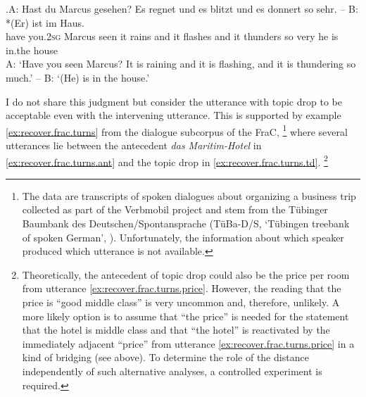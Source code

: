 \exg.\label{ex:recover.volodina.onea.rain}A: Hast du Marcus gesehen? Es regnet und es blitzt und es donnert so sehr. -- B: *(Er) ist im Haus.\\
{} have you.\textsc{2sg} Marcus seen it rains and it flashes and it thunders so very {} {} \phantom{*}he is in.the house\\
A: `Have you seen Marcus? It is raining and it is flashing, and it is thundering so much.' -- B: `(He) is in the house.' \citep[217, their judgment]{volodina.onea2012}

I do not share this judgment but consider the utterance with topic drop to be acceptable even with the intervening utterance.
This is supported by example \ref{ex:recover.frac.turns} from the dialogue subcorpus of the FraC,%
\footnote{ The data are transcripts of spoken dialogues about organizing a business trip collected as part of the Verbmobil project \citep{burger.etal2000} and stem from the Tübinger Baumbank des Deutschen/Spontansprache (TüBa-D/S, `Tübingen treebank of spoken German', \cite{hinrichs.etal2000}).
Unfortunately, the information about which speaker produced which utterance is not available.}
%
where several utterances lie between the antecedent \textit{das Maritim-Hotel} in \ref{ex:recover.frac.turns.ant} and the topic drop in \ref{ex:recover.frac.turns.td}.%
\footnote{Theoretically, the antecedent of topic drop could also be the price per room from utterance \ref{ex:recover.frac.turns.price}.
However, the reading that the price is ``good middle class'' is very uncommon and, therefore, unlikely.
A more likely option is to assume that ``the price'' is needed for the statement that the hotel is middle class and that ``the hotel'' is reactivated by the immediately adjacent ``price'' from utterance \ref{ex:recover.frac.turns.price} in a kind of bridging (see above).
To determine the role of the distance independently of such alternative analyses, a controlled experiment is required.
}

